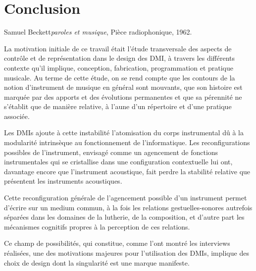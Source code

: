 %
\chapter{Conclusion}
\label{ch:conclusion}

{Samuel Beckett}{\textit{paroles et musique}, Pièce radiophonique, 1962. \cite{beckett_comeet_2014}}


\noindent La motivation initiale de ce travail était l'étude transversale des aspects de contrôle et de représentation dans le design des \gls{DMI}, à travers les différents contexte qu'il implique, conception, fabrication, programmation et pratique musicale. Au terme de cette étude, on se rend compte que les contours de la notion d'instrument de musique en général sont mouvants, que son histoire est marquée par des apports et des évolutions permanentes et que sa pérennité ne s'établit que de manière relative, à l'aune d'un répertoire et d'une pratique associée.

Les \glspl{DMI} ajoute à cette instabilité l'atomisation du corps instrumental dû à la modularité intrinsèque au fonctionnement de l'informatique. Les reconfigurations possibles de l'instrument, envisagé comme un agencement de fonctions instrumentales qui se cristallise dans une configuration contextuelle lui ont, davantage encore que l'instrument acoustique, fait perdre la stabilité relative que présentent les instruments acoustiques.

Cette reconfiguration générale de l'agencement possible d'un instrument permet d'écrire sur un medium commun, à la fois les relations gestuelles-sonores autrefois séparées dans les domaines de la lutherie, de la composition, et d'autre part les mécanismes cognitifs propres à la perception de ces relations.


Ce champ de possibilités, qui constitue, comme l'ont montré les interviews réalisées, une des motivations majeures pour l'utilisation des \glspl{DMI}, implique des choix de design dont la singularité est une marque manifeste. 

